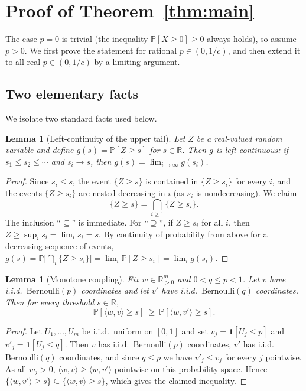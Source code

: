\documentclass[11pt]{amsart}
\theoremstyle{plain}
\newtheorem{lemma}[theorem]{Lemma}
\theoremstyle{definition}
\def\bR{\mathbb{R}}
\def\Pb{\mathbb{P}}
\begin{document}
\section{Proof of Theorem~\ref{thm:main}}

The case $p=0$ is trivial (the inequality $\Pb[X\ge 0]\ge 0$ always holds), so
assume $p>0$. We first prove the statement for rational $p\in(0,1/c)$, and then
extend it to all real $p\in(0,1/c)$ by a limiting argument.

\subsection{Two elementary facts}

We isolate two standard facts used below.

\begin{lemma}[Left-continuity of the upper tail]\label{lem:leftcont}
Let $Z$ be a real-valued random variable and define
$g(s)=\Pb[Z\ge s]$ for $s\in\bR$. Then $g$ is left-continuous: if
$s_1\le s_2\le\cdots$ and $s_i\to s$, then $g(s)=\lim_{i\to\infty}g(s_i)$.
\end{lemma}

\begin{proof}
Since $s_i\le s$, the event $\{Z\ge s\}$ is contained in $\{Z\ge s_i\}$ for every
$i$, and the events $\{Z\ge s_i\}$ are nested decreasing in $i$ (as $s_i$ is
nondecreasing). We claim
\[
\{Z\ge s\}=\bigcap_{i\ge1}\{Z\ge s_i\}.
\]
The inclusion ``$\subseteq$'' is immediate. For ``$\supseteq$'', if $Z\ge s_i$ for
all $i$, then $Z\ge\sup_i s_i=\lim_i s_i=s$. By continuity of probability from
above for a decreasing sequence of events,
$g(s)=\Pb\big[\bigcap_i\{Z\ge s_i\}\big]=\lim_i\Pb[Z\ge s_i]=\lim_i g(s_i)$.
\end{proof}

\begin{lemma}[Monotone coupling]\label{lem:coupling}
Fix $w\in\bR_{>0}^m$ and $0<q\le p<1$. Let $v$ have i.i.d.\
$\mathrm{Bernoulli}(p)$ coordinates and let $v'$ have i.i.d.\
$\mathrm{Bernoulli}(q)$ coordinates. Then for every threshold $s\in\bR$,
\[
\Pb[\langle w,v\rangle\ge s]\ \ge\ \Pb[\langle w,v'\rangle\ge s].
\]
\end{lemma}

\begin{proof}
Let $U_1,\dots,U_m$ be i.i.d.\ uniform on $[0,1]$ and set
$v_j=\mathbf 1[U_j\le p]$ and $v'_j=\mathbf 1[U_j\le q]$. Then $v$ has i.i.d.\
$\mathrm{Bernoulli}(p)$ coordinates, $v'$ has i.i.d.\
$\mathrm{Bernoulli}(q)$ coordinates, and since $q\le p$ we have $v'_j\le v_j$ for
every $j$ pointwise. As all $w_j>0$,
$\langle w,v\rangle\ge\langle w,v'\rangle$ pointwise on this probability space.
Hence $\{\langle w,v'\rangle\ge s\}\subseteq\{\langle w,v\rangle\ge s\}$, which
gives the claimed inequality.
\end{proof}
\end{document}
